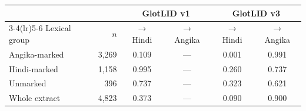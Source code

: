 \begin{tabular}{lrcccc}
\toprule
& & \multicolumn{2}{c}{GlotLID v1} & \multicolumn{2}{c}{GlotLID v3}\\
\cmidrule(lr){3-4}\cmidrule(lr){5-6}
Lexical group & $n$ & $\rightarrow$ Hindi & $\rightarrow$ Angika & $\rightarrow$ Hindi & $\rightarrow$ Angika\\
\midrule
Angika-marked & 3{,}269 & 0.109 & --- & 0.001 & 0.991\\
Hindi-marked  & 1{,}158 & 0.995 & --- & 0.260 & 0.737\\
Unmarked      &   396 & 0.737 & --- & 0.323 & 0.621\\
\midrule
Whole extract & 4{,}823 & 0.373 & --- & 0.090 & 0.900\\
\bottomrule
\end{tabular}
